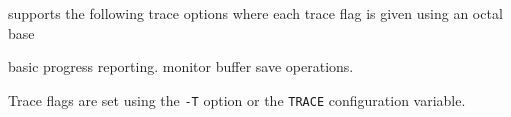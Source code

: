 
 supports the following trace options where each
trace flag is given using an octal base
\begin{optlist}

  basic progress reporting. 
  monitor buffer save operations.
\end{optlist}
Trace flags are set using the \texttt{-T} option or the  \texttt{TRACE} 
configuration variable.







